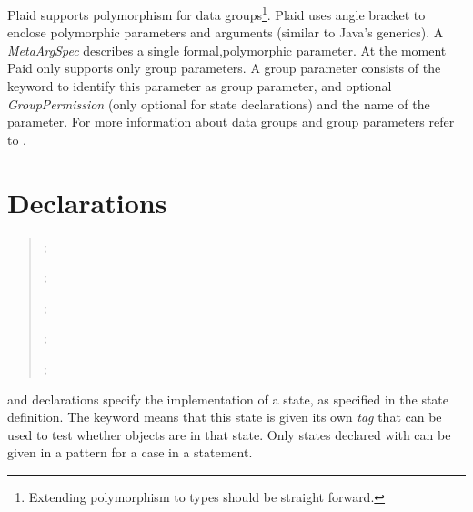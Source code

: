 Plaid supports polymorphism for data groups\footnote{Extending
  polymorphism to types should be straight forward.}. Plaid uses angle
bracket to enclose polymorphic parameters and arguments (similar to
Java's generics). A \emph{MetaArgSpec} describes a single
formal,polymorphic parameter. At the moment Paid only supports only
group parameters. A group parameter consists of the 
keyword to identify this parameter as group parameter, and optional
\emph{GroupPermission} (only optional for state declarations) and the
name of the parameter. For more information about data groups and
group parameters refer to \cite{stork09:concurrency_by_default,
  stork10:uaeminium_spec}.

\section{Declarations}

\begin{quote}

 {}

 {}


 {}    
           \opt{;}

  {}    
           \opt{;}

 {}  ;

 {}  

 {}  ;

 {}  ;



 {}  ;

 {}    ;

\end{quote}

 and  declarations specify the implementation of a state,
as specified in the state definition. The  keyword means that this state is given its
own \textit{tag} that can be used to test whether objects are in that state.  Only states declared with  can be given in a pattern for a case in a  statement.

